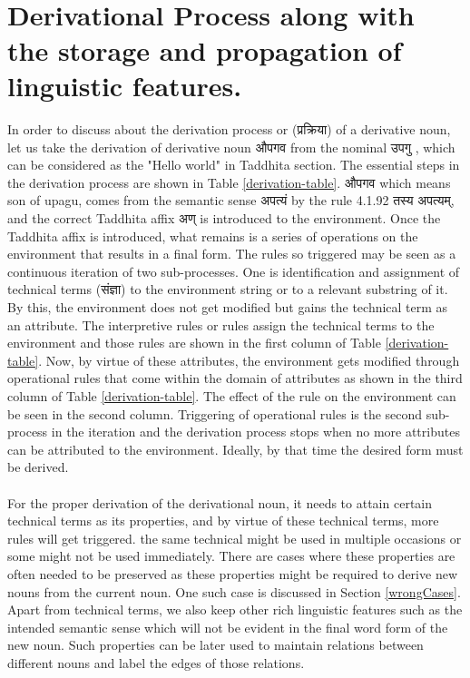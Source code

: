 \documentclass[a4paper,11pt,twoside,openright]{report}
\begin{document}
\\
\section{Derivational Process along with the storage and propagation of linguistic features.}
\label{sect:intro-deri}

In order to discuss about the derivation process or ({\skt प्रक्रिया}) of a derivative noun, let us take the derivation of derivative noun {\skt औपगव} from the nominal {\skt उपगु  }, which can be considered as the 	"Hello world" in Taddhita section. The essential steps in the derivation process are shown in Table \ref{derivation-table}.  {\skt औपगव} which means son of upagu, comes from the semantic sense {\skt अपत्यं} by the rule 4.1.92 {\skt तस्य अपत्यम्}, and the correct Taddhita affix {\skt अण् } is introduced to the environment. Once the Taddhita affix is introduced, what remains is a series of operations on the environment that results in a final form. The rules so triggered may be seen as a continuous iteration of two sub-processes. One is identification and assignment of technical terms ({\skt संज्ञा}) to the environment string or to a relevant substring of it. By this, the environment does not get modified but gains the technical term as an attribute. The interpretive rules or rules assign the technical terms to the environment and those rules are shown in the first column of Table \ref{derivation-table}. Now, by virtue of these attributes, the environment gets modified through operational rules that come within the domain of attributes as shown in the third column of Table \ref{derivation-table}.  The effect of the rule on the environment can be seen in the second column.  Triggering of operational rules is the second sub-process in the iteration and the derivation process stops when no more attributes can be attributed to the environment. Ideally, by that time the desired form must be derived. 
\\ \\
For the proper derivation of the derivational noun, it needs to attain certain technical terms as its properties, and by virtue of these technical terms, more rules will get triggered. the same technical might be used in multiple occasions or some might not be used immediately. There are cases where these properties are often needed to be preserved as these properties might be required to derive new nouns from the current noun. One such case is discussed in Section \ref{wrongCases}. Apart from technical terms, we also keep other rich linguistic features such as the intended semantic sense which will not be evident in the final word form of the new noun. Such properties can be later used to maintain relations between different nouns and label the edges of those relations.
\end{document}
